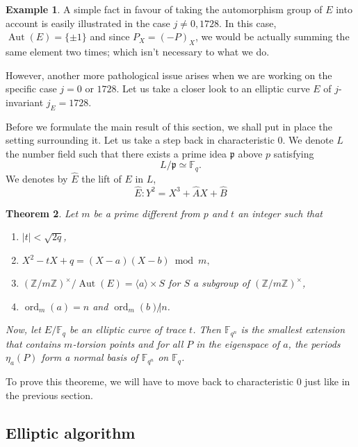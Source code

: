 \documentclass[12pt]{article}
\theoremstyle{plain}
\newtheorem{theorem}{Theorem}
\theoremstyle{definition}
\newtheorem{example}[theorem]{Example}
\DeclareMathOperator{\order}{ord} %
\DeclareMathOperator{\Aut}{Aut}
\def\Z{\ensuremath{\mathbb{Z}}}
\def\F{\ensuremath{\mathbb{F}}}
\newcounter{algorithm}
\begin{document}
\begin{example}
A simple fact in favour of taking the automorphism group of $E$ into account is
easily illustrated in the case $j\neq0,1728$. In this case, $\Aut(E) =
\lbrace{\pm1}\rbrace$ and since $P_X = (-P)_X$, we would be actually summing the
same element two times; which isn't necessary to what we do.\par
However, another more pathological issue arises when we are working on the
specific case $j = 0$ or $1728$. Let us take a closer look to an elliptic curve
$E$ of $j$-invariant $j_E = 1728$. %

\end{example}

Before we formulate the main result of this section, we shall put in place the
setting surrounding it. Let us take a step back in characteristic $0$. We denote
$L$ the number field such that there exists a prime idea $\mathfrak{p}$ above
$p$ satisfying 
\begin{equation}
L/\mathfrak{p} \simeq \F_q.
\end{equation}
We denotes by $\widehat{E}$ the lift of $E$ in $L$,
\[
\widehat{E} : Y^2 = X^3 + \widehat{A}X + \widehat{B}
\]



\begin{theorem}
\label{theorem:ellperiods}
Let $m$ be a prime different from $p$ and $t$ an integer such that 

\begin{enumerate}
    \item $\mid t\mid < \sqrt{2q}$,
    \item $X^2 - tX + q = (X - a)(X - b)\bmod m,$
    \item $(\Z/m\Z)^{\times}/\Aut(E) = \langle{a}\rangle \times S$ for $S$ a subgroup of
$(\Z/m\Z)^{\times}$,
    \item $\order_m(a) = n$ and $\order_m(b) \not| n$.
\end{enumerate}
Now, let $E/\F_q$ be an elliptic curve of trace $t$. Then $\F_{q^n}$ is the
smallest extension that contains $m$-torsion points and for all $P$ in the
eigenspace of $a$, the periods $\eta_a(P)$ form a normal basis of $\F_{q^n}$ on
$\F_q$.

\end{theorem}

To prove this theoreme, we will have to move back to characteristic $0$ just
like in the previous section.

\subsection{Elliptic algorithm}
\end{document}
